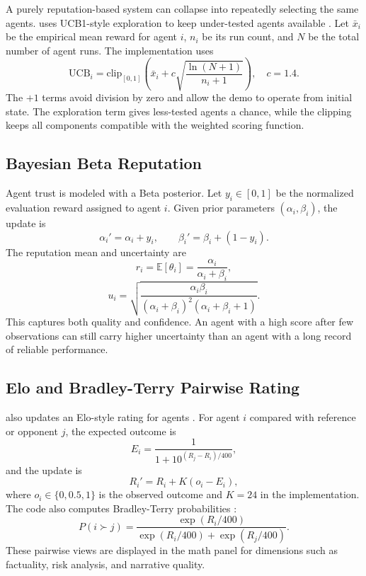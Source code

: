 A purely reputation-based system can collapse into repeatedly selecting the same agents. \systemname{} uses UCB1-style exploration to keep under-tested agents available \citep{auer2002finite}. Let \(\bar{x}_i\) be the empirical mean reward for agent \(i\), \(n_i\) be its run count, and \(N\) be the total number of agent runs. The implementation uses
\begin{equation}
\mathrm{UCB}_i =
\mathrm{clip}_{[0,1]}
\left(
\bar{x}_i + c\sqrt{\frac{\ln(N+1)}{n_i+1}}
\right),
\quad c=1.4.
\end{equation}
The \(+1\) terms avoid division by zero and allow the demo to operate from initial state. The exploration term gives less-tested agents a chance, while the clipping keeps all components compatible with the weighted scoring function.

\subsection{Bayesian Beta Reputation}

Agent trust is modeled with a Beta posterior. Let \(y_i\in[0,1]\) be the normalized evaluation reward assigned to agent \(i\). Given prior parameters \((\alpha_i,\beta_i)\), the update is
\begin{equation}
\alpha_i' = \alpha_i + y_i,\qquad
\beta_i' = \beta_i + (1-y_i).
\end{equation}
The reputation mean and uncertainty are
\begin{equation}
r_i = \mathbb{E}[\theta_i] =
\frac{\alpha_i}{\alpha_i+\beta_i},
\end{equation}
\begin{equation}
u_i =
\sqrt{
\frac{\alpha_i\beta_i}
{(\alpha_i+\beta_i)^2(\alpha_i+\beta_i+1)}
}.
\end{equation}
This captures both quality and confidence. An agent with a high score after few observations can still carry higher uncertainty than an agent with a long record of reliable performance.

\subsection{Elo and Bradley-Terry Pairwise Rating}

\systemname{} also updates an Elo-style rating for agents \citep{elo1978rating}. For agent \(i\) compared with reference or opponent \(j\), the expected outcome is
\begin{equation}
E_i =
\frac{1}{1+10^{(R_j-R_i)/400}},
\end{equation}
and the update is
\begin{equation}
R_i' = R_i + K(o_i - E_i),
\end{equation}
where \(o_i\in\{0,0.5,1\}\) is the observed outcome and \(K=24\) in the implementation. The code also computes Bradley-Terry probabilities \citep{bradley1952rank}:
\begin{equation}
P(i \succ j)=
\frac{\exp(R_i/400)}
{\exp(R_i/400)+\exp(R_j/400)}.
\end{equation}
These pairwise views are displayed in the math panel for dimensions such as factuality, risk analysis, and narrative quality.

